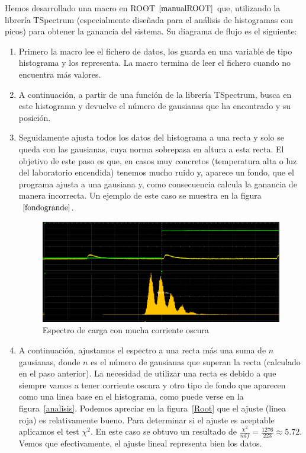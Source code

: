 Hemos desarrollado una macro en ROOT$~\cite{manualROOT}$ que, utilizando la librería TSpectrum (especialmente diseñada para el análisis de histogramas con picos) para obtener la ganancia del sistema. Su diagrama de flujo es el siguiente:
\begin{enumerate}
\item {} Primero la macro lee el fichero de datos, los guarda en una variable de tipo histograma y los representa. La macro termina de leer el fichero cuando no encuentra más valores.

\item {} A continuación, a partir de una función de la librería TSpectrum, busca en este histograma y devuelve el número de gausianas que ha encontrado y su posición.

\item {} Seguidamente ajusta todos los datos del histograma a una recta y solo se queda con las gausianas, cuya norma sobrepasa en altura a esta recta. El objetivo de este paso es que, en casos muy concretos (temperatura alta o luz del laboratorio encendida) tenemos mucho ruido y, aparece un fondo,  que el programa ajusta a una gausiana y, como consecuencia calcula la ganancia de manera incorrecta. Un ejemplo de este caso se muestra en la figura$~\ref{fondogrande}$.

\begin{figure}[hbtp]
\centering
\includegraphics[scale=0.4]{fondogaussiano.png}
\caption{Espectro de carga con mucha corriente oscura\label{fondogrande}}
\end{figure}

\item {} A continuación, ajustamos el espectro a una recta más una suma de $n$ gausianas, donde $n$ es el número de gausianas que superan la recta (calculado en el paso anterior). La necesidad de utilizar una recta es debido a que siempre vamos a tener corriente oscura y otro tipo de fondo que aparecen como una linea base en el histograma, como puede verse en la figura~\ref{analisis}. Podemos apreciar en la figura~\ref{Root} que el ajuste (linea roja) es relativamente bueno. Para determinar si el ajuste es aceptable aplicamos el test $\chi^2$. En este caso se obtuvo un resultado de $\frac{\chi^2}{ndf}=\frac{1276}{223}\approx 5.72$. Vemos que efectivamente, el ajuste lineal representa bien los datos.


\end{enumerate}
